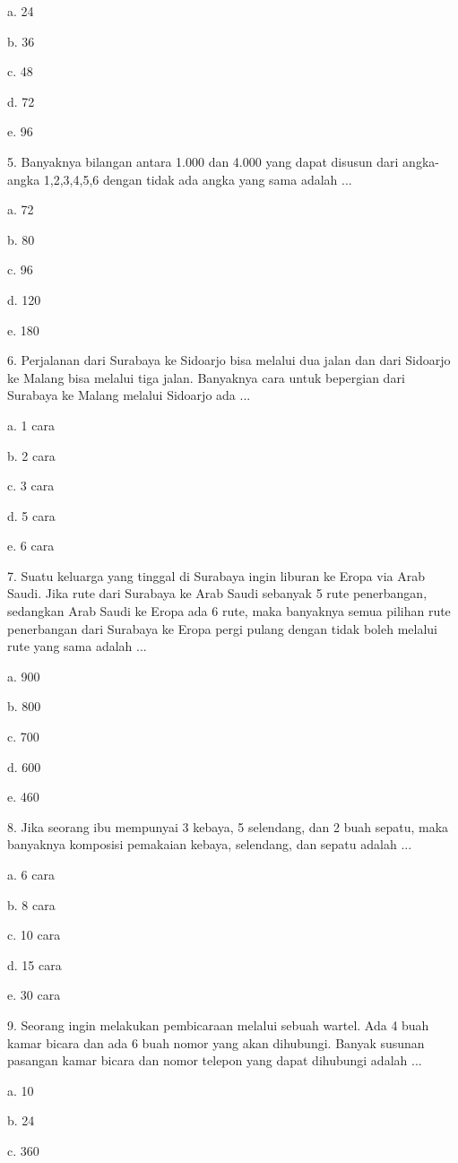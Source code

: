 \documentclass[11pt,fleqn]{book} %
\begin{document}
a.	24

b.	36

c.	48

d.	72

e.	96


5. Banyaknya bilangan antara 1.000 dan 4.000 yang dapat disusun dari angka-angka 1,2,3,4,5,6 dengan tidak ada angka yang sama adalah ... 

a.	72

b.	80

c.	96

d.	120

e.	180


6. Perjalanan dari Surabaya ke Sidoarjo bisa melalui dua jalan dan dari Sidoarjo ke Malang bisa melalui tiga jalan. Banyaknya cara untuk bepergian dari Surabaya ke Malang melalui Sidoarjo ada ... 

a.	1 cara

b.	2 cara

c.	3 cara

d.	5 cara

e.	6 cara


7. Suatu keluarga yang tinggal di Surabaya ingin liburan ke Eropa via Arab Saudi. Jika rute dari Surabaya ke Arab Saudi sebanyak 5 rute penerbangan, sedangkan Arab Saudi ke Eropa ada 6 rute, maka banyaknya semua pilihan rute penerbangan dari Surabaya ke Eropa pergi pulang dengan tidak boleh melalui rute yang sama adalah ... 

a.	900

b.	800

c.	700

d.	600

e.	460


8. Jika seorang ibu mempunyai 3 kebaya, 5 selendang, dan 2 buah sepatu, maka banyaknya komposisi pemakaian kebaya, selendang, dan sepatu adalah ... 

a.	6 cara

b.	8 cara

c.	10 cara

d.	15 cara

e.	30 cara

9. Seorang ingin melakukan pembicaraan melalui sebuah wartel. Ada 4 buah kamar bicara dan ada 6 buah nomor yang akan dihubungi. Banyak susunan pasangan kamar bicara dan nomor telepon yang dapat dihubungi adalah ... 

a.	10

b.	24

c.	360
\end{document}
